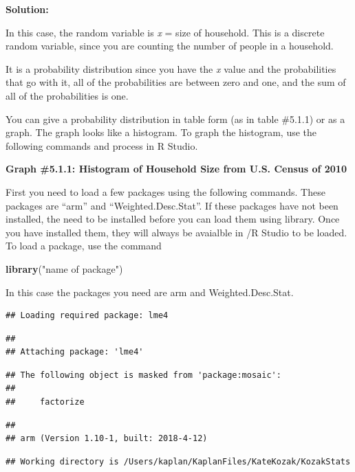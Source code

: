 \documentclass[
]{book}
\newenvironment{Shaded}{\begin{snugshade}}{\end{snugshade}}
\newcommand{\KeywordTok}[1]{\textcolor[rgb]{0.13,0.29,0.53}{\textbf{#1}}}
\newcommand{\NormalTok}[1]{#1}
\newcommand{\StringTok}[1]{\textcolor[rgb]{0.31,0.60,0.02}{#1}}
\begin{document}
\textbf{Solution:}

In this case, the random variable is \emph{x} = size of household. This is a discrete random variable, since you are counting the number of people in a household.

It is a probability distribution since you have the \emph{x} value and the probabilities that go with it, all of the probabilities are between zero and one, and the sum of all of the probabilities is one.

You can give a probability distribution in table form (as in table \#5.1.1) or as a graph. The graph looks like a histogram. To graph the histogram, use the following commands and process in R Studio.

\textbf{Graph \#5.1.1: Histogram of Household Size from U.S. Census of 2010}

First you need to load a few packages using the following commands. These packages are ``arm'' and ``Weighted.Desc.Stat''. If these packages have not been installed, the need to be installed before you can load them using library. Once you have installed them, they will always be avaialble in /R Studio to be loaded. To load a package, use the command

\begin{Shaded}
\begin{Highlighting}[]
\KeywordTok{library}\NormalTok{(}\StringTok{"name of package"}\NormalTok{) }
\end{Highlighting}
\end{Shaded}

In this case the packages you need are arm and Weighted.Desc.Stat.

\begin{verbatim}
## Loading required package: lme4
\end{verbatim}

\begin{verbatim}
## 
## Attaching package: 'lme4'
\end{verbatim}

\begin{verbatim}
## The following object is masked from 'package:mosaic':
## 
##     factorize
\end{verbatim}

\begin{verbatim}
## 
## arm (Version 1.10-1, built: 2018-4-12)
\end{verbatim}

\begin{verbatim}
## Working directory is /Users/kaplan/KaplanFiles/KateKozak/KozakStats
\end{verbatim}
\end{document}
